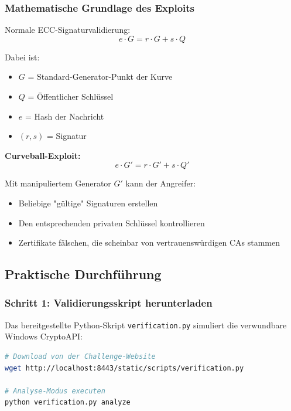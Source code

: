 \documentclass{article}
\begin{document}
\subsubsection{Mathematische Grundlage des Exploits}

Normale ECC-Signaturvalidierung:
\begin{equation}
e \cdot G = r \cdot G + s \cdot Q
\end{equation}

Dabei ist:
\begin{itemize}
    \item $G$ = Standard-Generator-Punkt der Kurve
    \item $Q$ = Öffentlicher Schlüssel
    \item $e$ = Hash der Nachricht
    \item $(r,s)$ = Signatur
\end{itemize}

\textbf{Curveball-Exploit:}
\begin{equation}
e \cdot G' = r \cdot G' + s \cdot Q'
\end{equation}

Mit manipuliertem Generator $G'$ kann der Angreifer:
\begin{itemize}
    \item Beliebige "gültige" Signaturen erstellen
    \item Den entsprechenden privaten Schlüssel kontrollieren
    \item Zertifikate fälschen, die scheinbar von vertrauenswürdigen CAs stammen
\end{itemize}

\subsection{Praktische Durchführung}

\subsubsection{Schritt 1: Validierungsskript herunterladen}

Das bereitgestellte Python-Skript \texttt{verification.py} simuliert die verwundbare Windows CryptoAPI:

\begin{lstlisting}[language=bash, caption=Skript-Download]
# Download von der Challenge-Website
wget http://localhost:8443/static/scripts/verification.py

# Analyse-Modus executen
python verification.py analyze
\end{lstlisting}
\end{document}
